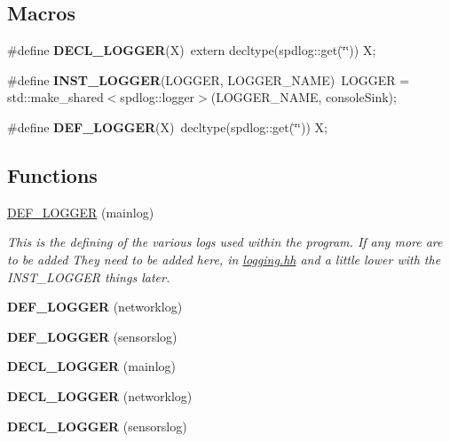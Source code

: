 \subsection*{Macros}
\begin{DoxyCompactItemize}
\item 
\mbox{\label{logging_8hh_a3f987878202e572888e51b0010fe1dce}} 
\#define {\bfseries D\+E\+C\+L\+\_\+\+L\+O\+G\+G\+ER}(X)~extern decltype(spdlog\+::get(\char`\"{}\char`\"{})) X;
\item 
\mbox{\label{logging_8hh_afe5ff6938e374f8ade78ba781a4a742e}} 
\#define {\bfseries I\+N\+S\+T\+\_\+\+L\+O\+G\+G\+ER}(L\+O\+G\+G\+ER,  L\+O\+G\+G\+E\+R\+\_\+\+N\+A\+ME)~L\+O\+G\+G\+ER = std\+::make\+\_\+shared$<$spdlog\+::logger$>$(L\+O\+G\+G\+E\+R\+\_\+\+N\+A\+ME, console\+Sink);
\item 
\mbox{\label{logging_8hh_a3e90f63040e6f216866895eec76c9792}} 
\#define {\bfseries D\+E\+F\+\_\+\+L\+O\+G\+G\+ER}(X)~decltype(spdlog\+::get(\char`\"{}\char`\"{})) X;
\end{DoxyCompactItemize}
\subsection*{Functions}
\begin{DoxyCompactItemize}
\item 
\hyperlink{logging_8hh_a25d3e12aaecd618c1176145894d5fb5a}{D\+E\+F\+\_\+\+L\+O\+G\+G\+ER} (mainlog)
\begin{DoxyCompactList}\small\item\em This is the defining of the various logs used within the program. If any more are to be added They need to be added here, in \hyperlink{logging_8hh}{logging.\+hh} and a little lower with the I\+N\+S\+T\+\_\+\+L\+O\+G\+G\+ER things later. \end{DoxyCompactList}\item 
\mbox{\label{logging_8hh_a3458c74e904c52b76d3e427b4c195c50}} 
{\bfseries D\+E\+F\+\_\+\+L\+O\+G\+G\+ER} (networklog)
\item 
\mbox{\label{logging_8hh_ab5cf5f3cabc1d43cc9485bc1906130a5}} 
{\bfseries D\+E\+F\+\_\+\+L\+O\+G\+G\+ER} (sensorslog)
\item 
\mbox{\label{logging_8hh_a6cd81cbf58fc52813054048504855105}} 
{\bfseries D\+E\+C\+L\+\_\+\+L\+O\+G\+G\+ER} (mainlog)
\item 
\mbox{\label{logging_8hh_a954cb5a32e8c75d84ddb56b69dc4216f}} 
{\bfseries D\+E\+C\+L\+\_\+\+L\+O\+G\+G\+ER} (networklog)
\item 
\mbox{\label{logging_8hh_ad0daa0546f229bbbcde099a0a8630531}} 
{\bfseries D\+E\+C\+L\+\_\+\+L\+O\+G\+G\+ER} (sensorslog)
\end{DoxyCompactItemize}



